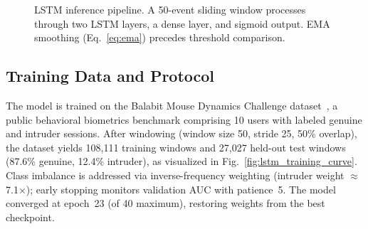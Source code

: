 \documentclass[journal,twoside,10pt]{IEEEtran}
\begin{document}
\begin{figure}[!t]
\centering
{}
\caption{LSTM inference pipeline. A 50-event sliding window processes
through two LSTM layers, a dense layer, and sigmoid output. EMA smoothing
(Eq.~\ref{eq:ema}) precedes threshold comparison.}
\label{fig:lstm_arch}
\end{figure}

\subsection{Training Data and Protocol}

The model is trained on the Balabit Mouse Dynamics Challenge
dataset~\cite{balabit}, a public behavioral biometrics benchmark comprising
10 users with labeled genuine and intruder sessions. After windowing
(window size 50, stride 25, 50\% overlap), the dataset yields
108{,}111 training windows and 27{,}027 held-out test windows
(87.6\% genuine, 12.4\% intruder), as visualized in
Fig.~\ref{fig:lstm_training_curve}. Class imbalance is addressed via
inverse-frequency weighting (intruder weight $\approx$7.1$\times$);
early stopping monitors validation AUC with patience~5. The model
converged at epoch~23 (of 40 maximum), restoring weights from the best
checkpoint.
\end{document}
